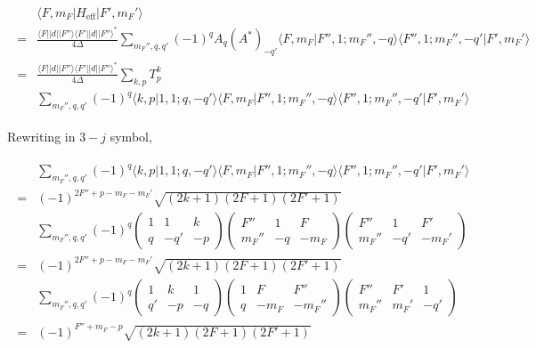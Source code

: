 \documentclass[10pt,fleqn]{article}
\newcommand{\eqar}[1]
{
  \begin{align}
    #1
  \end{align}
}
\newcommand{\paren}[1]{{\left({#1}\right)}}
\begin{document}
\eqar{
  \begin{split}
    &\langle F,m_F|H_{\mathrm{eff}}|F',m_F'\rangle\\
    =&\frac{\langle F||d||F''\rangle\langle F'||d||F''\rangle^*}{4\Delta}\!\!\sum_{m_F'',q,q'}\!\!(-1)^qA_{q}(A^*)_{-q'}\langle F,m_F|F'',1;m_F'',-q\rangle\langle F'',1;m_F'',-q'|F',m_F'\rangle\\
    =&\frac{\langle F||d||F''\rangle\langle F'||d||F''\rangle^*}{4\Delta}
       \!\sum_{k,p}T_p^k\\
    &\sum_{m_F'',q,q'}\!\!(-1)^q\langle k,p|1,1;q,-q'\rangle
      \langle F,m_F|F'',1;m_F'',-q\rangle\langle F'',1;m_F'',-q'|F',m_F'\rangle
  \end{split}
}
Rewriting in $3-j$ symbol,
\eqar{
  \begin{split}
    &\sum_{m_F'',q,q'}\!\!(-1)^q\langle k,p|1,1;q,-q'\rangle
      \langle F,m_F|F'',1;m_F'',-q\rangle\langle F'',1;m_F'',-q'|F',m_F'\rangle\\
    =&(-1)^{2F''+p-m_F-m_F'}\sqrt{\paren{2k+1}\paren{2F+1}\paren{2F'+1}}\\
    &\sum_{m_F'',q,q'}\!\!(-1)^q\begin{pmatrix}
      1&1&k\\
      q&-q'&-p
    \end{pmatrix}\begin{pmatrix}
      F''&1&F\\
      m_F''&-q&-m_F
    \end{pmatrix}\begin{pmatrix}
      F''&1&F'\\
      m_F''&-q'&-m_F'
    \end{pmatrix}\\
    =&(-1)^{2F''+p-m_F-m_F'}\sqrt{\paren{2k+1}\paren{2F+1}\paren{2F'+1}}\\
    &\sum_{m_F'',q,q'}\!\!(-1)^q\begin{pmatrix}
      1&k&1\\
      q'&-p&-q
    \end{pmatrix}\begin{pmatrix}
      1&F&F''\\
      q&-m_F&-m_F''
    \end{pmatrix}\begin{pmatrix}
      F''&F'&1\\
      m_F''&m_F'&-q'
    \end{pmatrix}\\
    =&(-1)^{F''+m_F-p}\sqrt{\paren{2k+1}\paren{2F+1}\paren{2F'+1}}\\

\end{split}}
\end{document}
